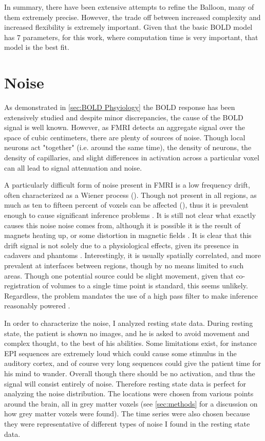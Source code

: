 In summary, there have been extensive attempts to refine the Balloon,
many of them extremely precise. However, the trade off 
between increased complexity and increased flexibility is extremely 
important. Given that the basic BOLD model has 7 parameters, for this
work, where computation time is very important, that model is
the best fit.

\section{Noise}
\label{sec:Introduction Noise}
As demonstrated in \autoref{sec:BOLD Phsyiology} the BOLD response has been
extensively studied and despite minor discrepancies, the cause of the BOLD 
signal is well known. However, as FMRI detects an  
aggregate signal over the space of cubic centimeters, there are
plenty of sources of noise. Though local neurons act
"together" (i.e. around the same time), the density of neurons, the
density of capillaries, and slight differences in activation across 
a particular voxel can all lead to signal attenuation and noise. 

A particularly difficult form of noise present in FMRI is a low frequency
drift, often characterized as a Wiener process (\cite{Riera2004}). 
Though not present in all regions, as much as ten to fifteen percent
of voxels can be affected (\cite{Tanabe2002}), thus it is prevalent enough to cause significant
inference problems \cite{Smith2007}. It is still not
clear what exactly causes this noise noise comes from, although it is possible it is 
the result of magnets heating up, or some distortion in magnetic
fields \cite{Smith2007}. It is clear that this drift signal is not solely
due to a physiological effects, given its presence in cadavers and phantoms 
\cite{Smith1999}. Interestingly, it is usually spatially correlated, and
more prevalent at interfaces between regions, though 
by no means limited to such areas. Though one potential source
could be slight movement, given that co-registration of volumes to a single time
point is standard, this seems unlikely. Regardless, the problem mandates
the use of a high pass filter to make inference reasonably powered
\cite{Smith2007}.

In order to characterize the noise, I analyzed resting state data.
During resting state, the patient is shown no images, and he is asked
to avoid movement and complex thought, to the best of his abilities.
Some limitations exist, for instance EPI sequences are extremely loud
which could cause some stimulus in the auditory cortex, and of course
very long sequences could give the patient time for his mind to wander.
Overall though there should be no activation, and thus the signal will
consist entirely of noise. Therefore resting state data is perfect
for analyzing the noise distribution. The locations were chosen from
various points around the brain, all in grey matter voxels (see \autoref{sec:methods}
for a discussion on how grey matter voxels were found). The time
series were also chosen because they were representative of different types
of noise I found in the resting state data.


